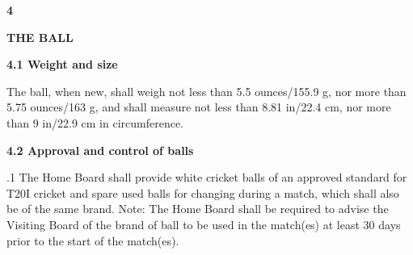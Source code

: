 \documentclass[12pt]{article}
\begin{document}
\vspace{\baselineskip}

\vspace{\baselineskip}

\vspace{\baselineskip}

\vspace{\baselineskip}

\vspace{\baselineskip}
\begin{adjustwidth}{0.0in}{-0.01in}
\begin{Center}
{\fontsize{8pt}{9.6pt}\par}
\end{Center}\par

\end{adjustwidth}


\vspace{\baselineskip}
{\fontsize{16pt}{19.2pt}\selectfont \textbf{4 \tabto{0.29in} }{\fontsize{15pt}{18.0pt}\selectfont \textbf{THE BALL}\par}\par}\par


\vspace{\baselineskip}
{\fontsize{11pt}{13.2pt}\selectfont \textbf{4.1 \tabto{0.47in} Weight and size}\par}\par


\vspace{\baselineskip}
\begin{adjustwidth}{0.0in}{0.42in}
{\fontsize{9pt}{10.8pt}\selectfont The ball, when new, shall weigh not less than 5.5 ounces/155.9 g, nor more than 5.75 ounces/163 g, and shall measure not less than 8.81 in/22.4 cm, nor more than 9 in/22.9 cm in circumference.\par}\par

\end{adjustwidth}


\vspace{\baselineskip}
{\fontsize{11pt}{13.2pt}\selectfont \textbf{4.2 \tabto{0.47in} Approval and control of balls}\par}\par


\vspace{\baselineskip}
\begin{adjustwidth}{0.5in}{0.04in}
{\fontsize{9pt}{10.8pt}.1 \tabto{0.49in} The Home Board shall provide white cricket balls of an approved standard for T20I cricket and spare used balls for changing during a match, which shall also be of the same brand. Note: The Home Board shall be required to advise the Visiting Board of the brand of ball to be used in the match(es) at least 30 days prior to the start of the match(es).\par}\par

\end{adjustwidth}
\end{document}
